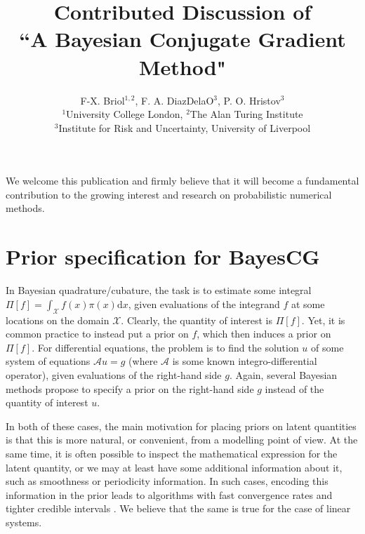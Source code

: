 \documentclass[twoside]{article}
\title{Contributed Discussion of \\``A Bayesian Conjugate Gradient Method"}
\author{F-X. Briol$^{1,2}$, F. A. DiazDelaO$^{3}$, P. O. Hristov$^{3}$\\ $^{1}$University College London, $^{2}$The Alan Turing Institute \\ $^{3}$Institute for Risk and Uncertainty, University of Liverpool}
\begin{document}
\maketitle
		We welcome this publication \cite{Cockayne2019} and firmly believe that it will become a fundamental contribution to the growing interest and research on probabilistic numerical methods.
		
	\section{Prior specification for BayesCG}
		In Bayesian quadrature/cubature, the task is to estimate some integral $\Pi[f] = \int_{\mathcal{X}} f(x) \pi(x) \mathrm{d}x$, given evaluations of the integrand $f$ at some locations on the domain $\mathcal{X}$. Clearly, the quantity of interest is 
		$\Pi[f]$. Yet, it is common practice to instead put a prior on $f$, which then induces a prior on $\Pi[f]$. For differential equations, the problem is to find the solution $u$ of some system of equations $\mathcal{A} u =g$ (where $\mathcal{A}$ is some known integro-differential operator), given evaluations of the right-hand side $g$. Again, several Bayesian methods \citep{Cockayne2016,Chkrebtii2016} propose to specify a prior on the right-hand side $g$ instead of the quantity of interest $u$.
		
		In both of these cases, the main motivation for placing priors on latent quantities is that this is more natural, or convenient, from a modelling point of view. At the same time, it is often possible to inspect the mathematical expression for the latent quantity, or we may at least have some additional information about it, such as smoothness or periodicity information. In such cases, encoding this information in the prior leads to algorithms with fast convergence rates and tighter credible intervals \cite{Cockayne2016,Briol2019PI}. We believe that the same is true for the case of linear systems.
		
\end{document}
